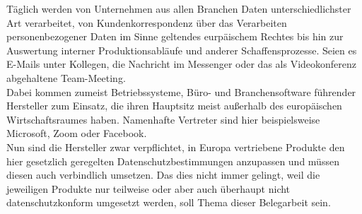 Täglich werden von Unternehmen aus allen Branchen Daten unterschiedlichster Art verarbeitet, von Kundenkorrespondenz über das Verarbeiten personenbezogener Daten im Sinne geltendes eurpäischem Rechtes bis hin zur Auswertung interner Produktionsabläufe und anderer Schaffensprozesse. Seien es E-Mails unter Kollegen, die Nachricht im Messenger oder das als Videokonferenz abgehaltene Team-Meeting.\\
Dabei kommen zumeist Betriebssysteme, Büro- und Branchensoftware führender Hersteller zum Einsatz, die ihren Hauptsitz meist außerhalb des europäischen Wirtschaftsraumes haben. Namenhafte Vertreter sind hier beispielsweise Microsoft, Zoom oder Facebook.\\
Nun sind die Hersteller zwar verpflichtet, in Europa vertriebene Produkte den hier gesetzlich geregelten Datenschutzbestimmungen anzupassen und müssen diesen auch verbindlich umsetzen. Das dies nicht immer gelingt, weil die jeweiligen Produkte nur teilweise oder aber auch überhaupt nicht datenschutzkonform umgesetzt werden, soll Thema dieser Belegarbeit sein.
